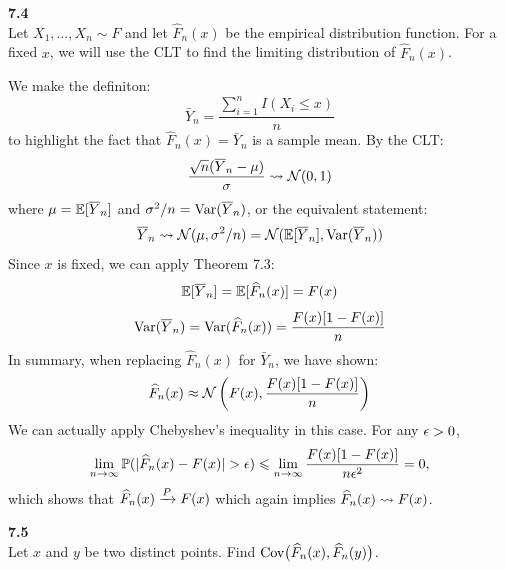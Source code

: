 \bigskip\noindent
\textbf{7.4}\\  %
Let $X_1,\ldots, X_n\sim F$ and let $\hat{F}_n(x)$ be the empirical distribution function.
For a fixed $x$, we will use the CLT to find the limiting distribution of $\hat{F}_n(x)$.

\medskip\noindent
We make the definiton:
$$
\bar{Y}_n = \frac{\sum_{i=1}^n I(X_i\leq x)}{n}
$$
to highlight the fact that $\hat{F}_n(x) = \bar{Y}_n$ is a sample mean. By the CLT:
$$
\frac{\sqrt{n}(\overline{Y}_n - \mu)}{\sigma} \rightsquigarrow \mathcal{N}(0, 1)
$$
where $\mu = \mathbb{E}[\overline{Y}_n]$ and $\sigma^2/n = \text{Var}(\overline{Y}_n)$, or the equivalent statement:
$$
\overline{Y}_n \rightsquigarrow \mathcal{N}(\mu, \sigma^2/n) = \mathcal{N}(\mathbb{E}[\overline{Y}_n], \text{Var}(\overline{Y}_n))
$$
Since $x$ is fixed, we can apply Theorem 7.3:
$$
\mathbb{E}[\overline{Y}_n] = \mathbb{E}[\widehat{F}_n(x)] = F(x)
$$
$$
\text{Var}(\overline{Y}_n) =\text{Var}(\widehat{F}_n(x)) = \frac{F(x)[1 - F(x)]}{n}
$$
In summary, when replacing $\hat{F}_n(x)$ for $\bar{Y}_n$, we have shown:
$$
\widehat{F}_n(x) \approx \mathcal{N}\left(F(x), \frac{F(x)[1 - F(x)]}{n}\right)
$$
We can actually apply Chebyshev's inequality in this case. For any $\epsilon > 0$,
$$
\lim_{n\rightarrow\infty}\mathbb{P}(|\widehat{F}_n(x) - F(x)| > \epsilon) \leqslant
\lim_{n\rightarrow\infty}\frac{F(x)[1 - F(x)]}{n\epsilon^2} = 0,
$$
which shows that $\widehat{F}_n(x) \xrightarrow{P} F(x)$ which again implies $\widehat{F}_n(x) \rightsquigarrow F(x)$.

\newpage\noindent
\textbf{7.5}\\  %
Let $x$ and $y$ be two distinct points. Find $\text{Cov}\big(\widehat{F}_n(x), \widehat{F}_n(y)\big)$. 

